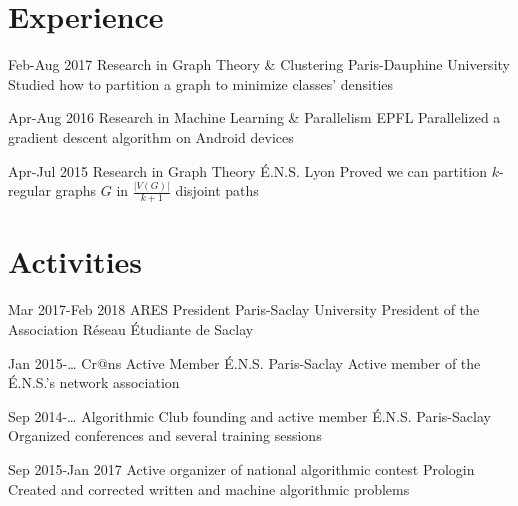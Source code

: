 \documentclass[letterpaper]{twentysecondcv} %
\begin{document}

\section{Experience}

\begin{twenty} %
	\twentyitem
    	{Feb-Aug 2017}
        {Research in Graph Theory \& Clustering}
        {Paris-Dauphine University}
        {}
        {Studied how to partition a graph to minimize classes' densities}
        
    \twentyitem
   		{Apr-Aug 2016}
        {Research in Machine Learning \& Parallelism}
        {EPFL}
        {}
        {Parallelized a gradient descent algorithm on Android devices}
        
     \twentyitem
   		{Apr-Jul 2015}
        {Research in Graph Theory}
        {É.N.S. Lyon}
        {}
        {Proved we can partition $k$-regular graphs $G$ in $\frac{|V(G)|}{k+1}$ disjoint paths}
        
\end{twenty}

\section{Activities}

\begin{twenty} %

	\twentyitem
	{Mar 2017-Feb 2018}
        {ARES President}
        {Paris-Saclay University}
        {}
        {President of the Association Réseau Étudiante de Saclay}

	\twentyitem
    	{Jan 2015-…}
        {Cr@ns Active Member}
        {É.N.S. Paris-Saclay}
        {}
        {Active member of the É.N.S.'s network association}
        
    \twentyitem
   	{Sep 2014-…}
        {Algorithmic Club founding and active member}
        {É.N.S. Paris-Saclay}
        {}
        {Organized conferences and several training sessions}
        
     \twentyitem
   	{Sep 2015-Jan 2017}
        {Active organizer of national algorithmic contest}
        {Prologin}
        {}
        {Created and corrected written and machine algorithmic problems}
        
        
\end{twenty}
\end{document}
